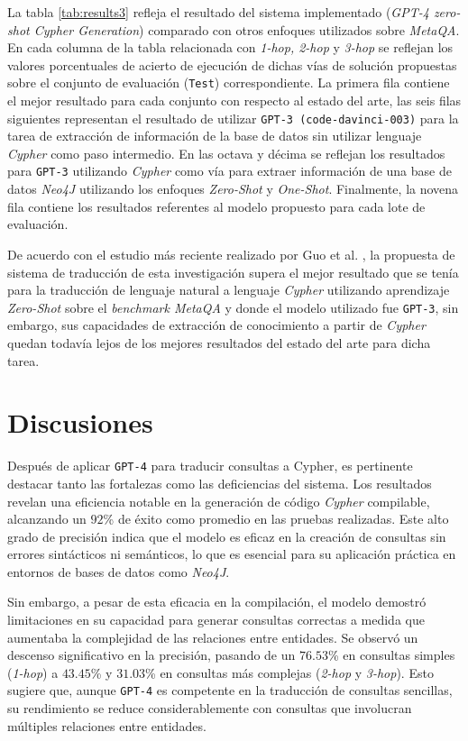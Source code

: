 La tabla \ref{tab:results3} refleja el resultado del sistema implementado (\textit{GPT-4 zero-shot Cypher Generation}) comparado con otros enfoques utilizados sobre \textit{MetaQA}. En cada columna de la tabla relacionada con \textit{1-hop, 2-hop} y \textit{3-hop} se reflejan los valores porcentuales de acierto de ejecución de dichas vías de solución propuestas sobre el conjunto de evaluación (\texttt{Test}) correspondiente. La primera fila contiene el mejor resultado para cada conjunto con respecto al estado del arte, las seis filas siguientes representan el resultado de utilizar \texttt{GPT-3 (code-davinci-003)} para la tarea de extracción de información de la base de datos sin utilizar lenguaje \textit{Cypher} como paso intermedio. En las octava y décima se reflejan los resultados para \texttt{GPT-3} utilizando \textit{Cypher} como vía para extraer información de una base de datos \textit{Neo4J} utilizando los enfoques \textit{Zero-Shot} y \textit{One-Shot}. Finalmente, la novena fila contiene los resultados referentes al modelo propuesto para cada lote de evaluación.

De acuerdo con el estudio más reciente realizado por Guo et al. \cite{gpt4graphpaper2023}, la propuesta de sistema de traducción de esta investigación supera el mejor resultado que se tenía para la traducción de lenguaje natural a lenguaje \textit{Cypher} utilizando aprendizaje \textit{Zero-Shot} sobre el \textit{benchmark MetaQA} y donde el modelo utilizado fue \texttt{GPT-3}, sin embargo, sus capacidades de extracción de conocimiento a partir de \textit{Cypher} quedan todavía lejos de los mejores resultados del estado del arte para dicha tarea.

\section{Discusiones}

Después de aplicar \texttt{GPT-4} para traducir consultas a Cypher, es pertinente destacar tanto las fortalezas como las deficiencias del sistema. Los resultados revelan una eficiencia notable en la generación de código \textit{Cypher} compilable, alcanzando un $92$\% de éxito como promedio en las pruebas realizadas. Este alto grado de precisión indica que el modelo es eficaz en la creación de consultas sin errores sintácticos ni semánticos, lo que es esencial para su aplicación práctica en entornos de bases de datos como \textit{Neo4J}.

Sin embargo, a pesar de esta eficacia en la compilación, el modelo demostró limitaciones en su capacidad para generar consultas correctas a medida que aumentaba la complejidad de las relaciones entre entidades. Se observó un descenso significativo en la precisión, pasando de un $76.53$\% en consultas simples (\textit{1-hop}) a $43.45$\% y $31.03$\% en consultas más complejas (\textit{2-hop} y \textit{3-hop}). Esto sugiere que, aunque \texttt{GPT-4} es competente en la traducción de consultas sencillas, su rendimiento se reduce considerablemente con consultas que involucran múltiples relaciones entre entidades. 

